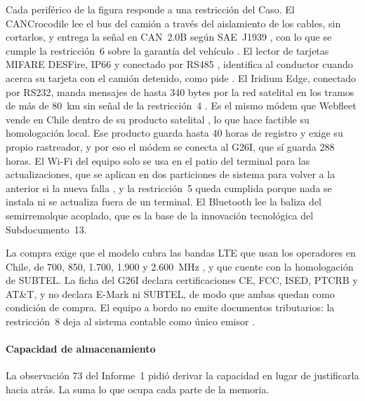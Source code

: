 Cada periférico de la figura responde a una restricción del Caso. El CANCrocodile lee el bus del camión
a través del aislamiento de los cables, sin cortarlos, y entrega la señal en CAN~2.0B según SAE~J1939
\parencite{technoton_cancrocodile}, con lo que se cumple la restricción~6 sobre la garantía del
vehículo . El lector de tarjetas MIFARE DESFire, IP66 y conectado por RS485
\parencite{gao_desfire}, identifica al conductor cuando acerca su tarjeta con el camión detenido, como
pide . El Iridium Edge, conectado por RS232, manda mensajes de hasta 340 bytes por
la red satelital \parencite{groundcontrol_edge} en los tramos de más de 80~km sin señal de la
restricción~4 . Es el mismo módem que Webfleet vende en Chile dentro de su
producto satelital \parencite{webfleet_sat_cl}, lo que hace factible su homologación local. Ese
producto guarda hasta 40 horas de registro y exige su propio rastreador, y por eso el módem se conecta
al G26I, que sí guarda 288 horas. El Wi-Fi del equipo solo se usa en el patio del terminal para las
actualizaciones, que se aplican en dos particiones de sistema para volver a la anterior si la nueva
falla \parencite{mender_variables}, y la restricción~5 queda cumplida porque nada se instala ni se
actualiza fuera de un terminal. El Bluetooth lee la baliza del semirremolque acoplado, que es la base
de la innovación tecnológica del Subdocumento~13.

La compra exige que el modelo cubra las bandas LTE que usan los operadores en Chile, de 700, 850,
1.700, 1.900 y 2.600~MHz \parencite{subtel_bandas}, y que cuente con la homologación de SUBTEL. La ficha
del G26I declara certificaciones CE, FCC, ISED, PTCRB y AT\&T, y no declara E-Mark ni SUBTEL, de modo
que ambas quedan como condición de compra. El equipo a bordo no emite documentos tributarios: la
restricción~8 deja al sistema contable como único emisor .

\paragraph{Capacidad de almacenamiento} La observación 73 del Informe~1 pidió derivar la capacidad en
lugar de justificarla hacia atrás. La  suma lo que ocupa cada parte de la memoria.

